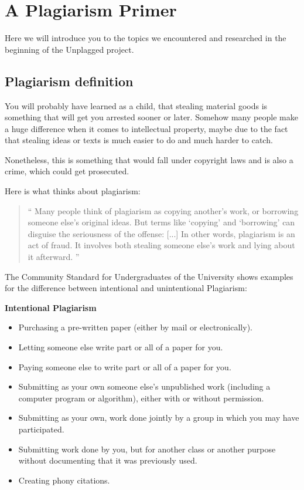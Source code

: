 \chapter{A Plagiarism Primer}\label{chap:plagOverview}

Here we will introduce you to the topics we encountered and researched in the beginning of the Unplagged project.

\section{Plagiarism definition}


You will probably have learned as a child, that stealing material goods is something that will get you arrested sooner or
later. Somehow many people make a huge difference when it comes to intellectual property, maybe due to the fact that 
stealing ideas or texts is much easier to do and much harder to catch.

Nonetheless, this is something that would fall under copyright laws and is also a crime, which could get prosecuted.

Here is what \citet{PlagiarismDotOrg} thinks about plagiarism:

\begin{quote}\enquote{
Many people think of plagiarism as copying another's work, or borrowing someone else's original ideas. But terms like 
\enquote{copying} and \enquote{borrowing} can disguise the seriousness of the offense: [...] In other words, plagiarism 
is an act of fraud. It involves both stealing someone else's work and lying about it afterward.
}
\end{quote}

The Community Standard for Undergraduates of the \citet{DukeSite} University  shows examples for the difference between intentional and unintentional Plagiarism:

\textbf{Intentional Plagiarism}


\begin{itemize}
\item Purchasing a pre-written paper (either by mail or electronically).
\item    Letting someone else write part or all of a paper for you.
\item    Paying someone else to write part or all of a paper for you.
\item    Submitting as your own someone else's unpublished work (including a computer program or algorithm), either with or without permission.
\item    Submitting as your own, work done jointly by a group in which you may have participated.
\item    Submitting work done by you, but for another class or another purpose without documenting that it was previously used.
\item    Creating phony citations.
\end{itemize}

